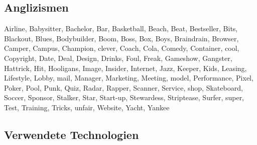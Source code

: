 \documentclass[11pt,numbers=noenddot]{scrartcl}
\begin{document}
\subsection{Anglizismen}

Airline, Babysitter, Bachelor, Bar, Basketball, Beach, Beat, Bestseller, Bits, Blackout, Blues, Bodybuilder, Boom, Boss, Box, Boys, Braindrain, Browser, Camper, Campus, Champion, clever, Coach, Cola, Comedy, Container, cool, Copyright, Date, Deal, Design, Drinks, Foul, Freak, Gameshow, Gangster, Hattrick, Hit, Hooligans, Image, Insider, Internet, Jazz, Keeper, Kids, Leasing, Lifestyle, Lobby, mail, Manager, Marketing, Meeting, model, Performance, Pixel, Poker, Pool, Punk, Quiz, Radar, Rapper, Scanner, Service, shop, Skateboard, Soccer, Sponsor, Stalker, Star, Start-up, Stewardess, Striptease, Surfer, super, Test, Training, Tricks, unfair, Website, Yacht, Yankee

\subsection{Verwendete Technologien}

\nocite{han2011}
\nocite{heyer2008}
\nocite{manning1999}


\end{document}
